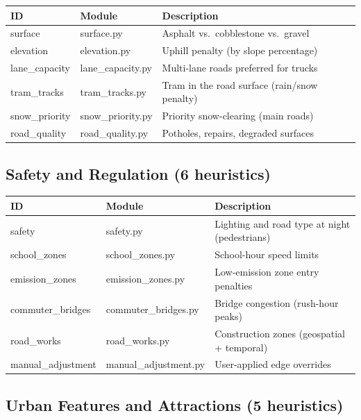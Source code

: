 \documentclass[12pt,a4paper]{article}
\begin{document}
\begin{table}[H]
\centering
\small
\begin{tabular}{lll}
\toprule
\textbf{ID} & \textbf{Module} & \textbf{Description} \\
\midrule
surface & surface.py & Asphalt vs.\ cobblestone vs.\ gravel \\
elevation & elevation.py & Uphill penalty (by slope percentage) \\
lane\_capacity & lane\_capacity.py & Multi-lane roads preferred for trucks \\
tram\_tracks & tram\_tracks.py & Tram in the road surface (rain/snow penalty) \\
snow\_priority & snow\_priority.py & Priority snow-clearing (main roads) \\
road\_quality & road\_quality.py & Potholes, repairs, degraded surfaces \\
\bottomrule
\end{tabular}
\end{table}

\subsection{Safety and Regulation (6 heuristics)}

\begin{table}[H]
\centering
\small
\begin{tabular}{lll}
\toprule
\textbf{ID} & \textbf{Module} & \textbf{Description} \\
\midrule
safety & safety.py & Lighting and road type at night (pedestrians) \\
school\_zones & school\_zones.py & School-hour speed limits \\
emission\_zones & emission\_zones.py & Low-emission zone entry penalties \\
commuter\_bridges & commuter\_bridges.py & Bridge congestion (rush-hour peaks) \\
road\_works & road\_works.py & Construction zones (geospatial + temporal) \\
manual\_adjustment & manual\_adjustment.py & User-applied edge overrides \\
\bottomrule
\end{tabular}
\end{table}

\subsection{Urban Features and Attractions (5 heuristics)}
\end{document}
